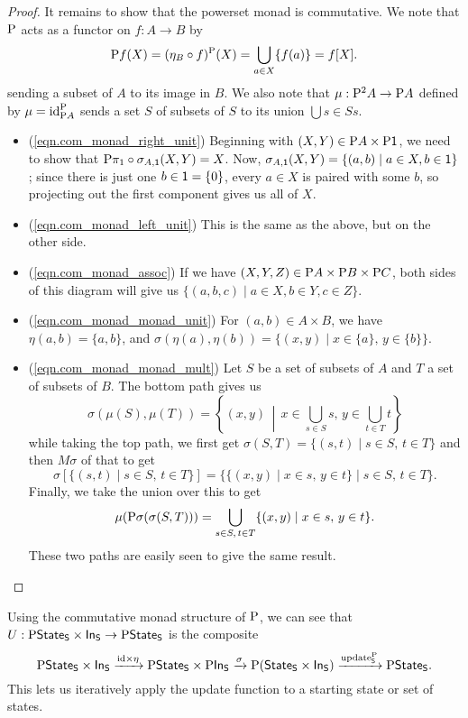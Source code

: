\documentclass[DynamicalBook]{subfiles}
\begin{document}
\begin{proof}
It remains to show that the powerset monad is commutative. We note that
$\mathrm{P}$ acts as a functor on $f : A \to B$ by 
\[
\mathrm{P} f (X) = (\eta_B \circ
f)^{\mathrm{P}}(X) = \bigcup_{a \in X}\{f(a)\} = f[X].
\]
sending a subset of $A$ to its image in $B$. We also note that $\mu : \mathrm{P}^2
A \to \mathrm{P} A$ defined by $\mu = \mathrm{id}_{\mathrm{P} A}^{\mathrm{P}}$ sends a set $S$
of subsets of $S$ to its union $\bigcup{s \in S} s$.
\begin{itemize}
  \item (\cref{eqn.com_monad_right_unit}) Beginning with $(X, Y) \in \mathrm{P} A \times \mathrm{P} \mathsf{1}$, we need to
    show that $\mathrm{P} \pi_1 \circ \sigma_{A, \mathsf{1}}(X, Y) = X$. Now,
    $\sigma_{A, \mathsf{1}}(X, Y) = \{(a, b) \mid a \in X, b \in \mathsf{1}\}$; since
    there is just one $b \in \mathsf{1} = \{0\}$, every $a \in X$ is paired with
    some $b$, so projecting out the first component gives us all of $X$.
    \item (\cref{eqn.com_monad_left_unit}) This is the same as the above, but on the other side.
    \item (\cref{eqn.com_monad_assoc}) If we have $(X, Y, Z) \in \mathrm{P} A \times \mathrm{P} B \times \mathrm{P}
      C$, both sides of this diagram will give us $\{(a, b, c) \mid a \in X, b
      \in Y, c \in Z\}$. 
    \item (\cref{eqn.com_monad_monad_unit}) For $(a, b) \in A \times B$, we have
      $\eta(a, b) = \{a, b\}$, and $\sigma(\eta(a), \eta(b)) = \{(x, y) \mid x
      \in \{a\},\, y \in \{b\}\}$.
   \item (\cref{eqn.com_monad_monad_mult}) Let $S$ be a set of subsets of $A$
     and $T$ a set of subsets of $B$. The bottom path gives us
     \[
\sigma(\mu(S), \mu(T)) = \left\{(x, y) \,\middle|\, x \in \bigcup_{s \in S} s,\, y \in \bigcup_{t \in T} t\right\}
\]
while taking the top path, we first get $\sigma(S, T) = \{(s, t) \mid s \in S,\,
t \in T\}$ and then $M\sigma$ of that to get
\[
\sigma\left[ \{(s, t) \mid s \in S,\, t \in T\} \right] = \{\{(x, y) \mid x \in
s,\, y \in t\} \mid s \in S,\, t \in T\}.
\]
Finally, we take the union over this to get
\[
\mu(\mathrm{P} \sigma(\sigma(S, T))) = \bigcup_{s \in S,\, t \in T}\{(x, y) \mid x \in s,\, y \in t\}.
\]
These two paths are easily seen to give the same result.
\end{itemize}
\end{proof}

Using the commutative monad structure of $\mathrm{P}$, we can see that $U : \mathrm{P}
\mathsf{State}_{\mathsf{S}} \times \mathsf{In}_{\mathsf{S}} \to \mathrm{P} \mathsf{State}_{\mathsf{S}}$ is the composite
$$\mathrm{P} \mathsf{State}_{\mathsf{S}} \times \mathsf{In}_{\mathsf{S}} \xrightarrow{\mathrm{id} \times \eta}
\mathrm{P}\mathsf{State}_{\mathsf{S}} \times \mathrm{P}\mathsf{In}_{\mathsf{S}} \xrightarrow{\sigma} \mathrm{P}(\mathsf{State}_{\mathsf{S}} \times
\mathsf{In}_{\mathsf{S}}) \xrightarrow{\mathrm{update}_{\mathsf{S}}^{\mathrm{P}}} \mathrm{P}\mathsf{State}_{\mathsf{S}}.$$
This lets us iteratively apply the update function to a starting state or set of
states.
\end{document}
